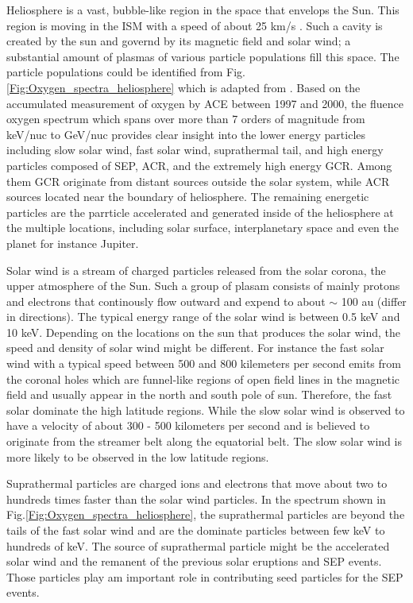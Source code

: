 Heliosphere is a vast, bubble-like region in the space that envelops the Sun. This region is moving in the \ac{ISM} with a speed of about 25 km/s \citep{McComas2015ApJS}. Such a cavity is created by the sun and governd by its magnetic field and solar wind; a substantial amount of plasmas of various particle populations fill this space. The particle populations could be identified from Fig.\ref{Fig:Oxygen_spectra_heliosphere} which is adapted from \citet{Mewaldt-2001}. Based on the accumulated measurement of oxygen by \ac{ACE} between 1997 and 2000, the fluence oxygen spectrum which spans over more than 7 orders of magnitude from keV/nuc to GeV/nuc provides clear insight into the lower energy particles including slow solar wind, fast solar wind, suprathermal tail, and high energy particles composed of \ac{SEP}, \ac{ACR}, and the extremely high energy \ac{GCR}. 
Among them \acs{GCR} originate from distant sources outside the solar system, while \acs{ACR} sources located near the boundary of heliosphere. The remaining energetic particles are the parrticle accelerated and generated inside of the heliosphere at the multiple locations, including solar surface, interplanetary space and even the planet for instance Jupiter.

Solar wind is a stream of charged particles released from the solar corona, the upper atmosphere of the Sun. Such a group of plasam consists of mainly protons and electrons that continously flow outward and expend to about $\sim$ 100 au (differ in directions). The typical energy range of the solar wind is between 0.5 keV and 10 keV. Depending on the locations on the sun that produces the solar wind, the speed and density of solar wind might be different. For instance the fast solar wind with a typical speed between 500 and 800 kilemeters per second emits from the coronal holes which are funnel-like regions of open field lines in the magnetic field and usually appear in the north and south pole of sun. Therefore, the fast solar dominate the high latitude regions. While the slow solar wind is observed to have a velocity of about 300 - 500 kilometers per second and is believed to originate from the streamer belt along the equatorial belt. The slow solar wind is more likely to be observed in the low latitude regions.


Suprathermal particles are charged ions and electrons that move about two to hundreds times faster than the solar wind particles. In the spectrum shown in Fig.\ref{Fig:Oxygen_spectra_heliosphere}, the suprathermal particles are beyond the tails of the fast solar wind and are the dominate particles between few keV to hundreds of keV. The source of suprathermal particle might be the accelerated solar wind and the remanent of the previous solar eruptions and \ac{SEP} events. Those particles play am important role in contributing seed particles for the \ac{SEP} events.

